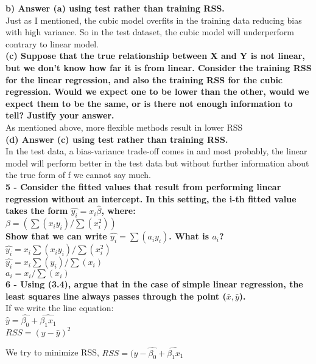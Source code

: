 \documentclass{article}
\begin{document}
\textbf{b) Answer (a) using test rather than training RSS.}\\

Just as I mentioned, the cubic model overfits in the training data reducing bias with high variance. So in the test dataset, the cubic model will underperform contrary to linear model.\\

\textbf{(c) Suppose that the true relationship between X and Y is not linear,
but we don’t know how far it is from linear. Consider the training
RSS for the linear regression, and also the training RSS for the
cubic regression. Would we expect one to be lower than the
other, would we expect them to be the same, or is there not
enough information to tell? Justify your answer.}\\

As mentioned above, more flexible methods result in lower RSS\\

\textbf{(d) Answer (c) using test rather than training RSS.}\\

In the test data, a bias-variance trade-off comes in and most probably, the linear model will perform better in the test data but without further information about the true form of f we cannot say much.\\

\textbf{5 - Consider the fitted values that result from performing linear regression without an intercept. In this setting, the i-th fitted value takes the form $\hat{y_i} = x_i\hat{\beta}$,
where:\\
$\beta = (\sum(x_iy_i)/\sum(x_i^2))$ \\Show that we can write $\hat{y_i} = \sum(a_iy_i)$. What is $a_i$?}\\

$\hat{y_i} = x_i \sum(x_iy_i)/\sum(x_i^2)$\\

$\hat{y_i} = x_i \sum(y_i)/\sum(x_i)$\\

$a_i = x_i / \sum(x_i)$ \\

\textbf{6 - Using (3.4), argue that in the case of simple linear regression, the
least squares line always passes through the point ($\bar{x},\bar{y}$).}\\

If we write the line equation:\\

$\hat{y} = \hat{\beta_0} + \hat{\beta_1x_1}$\\

$RSS = (y-\hat{y})^2$

We try to minimize RSS, $RSS = (y- \hat{\beta_0} + \hat{\beta_1x_1}$
\end{document}
